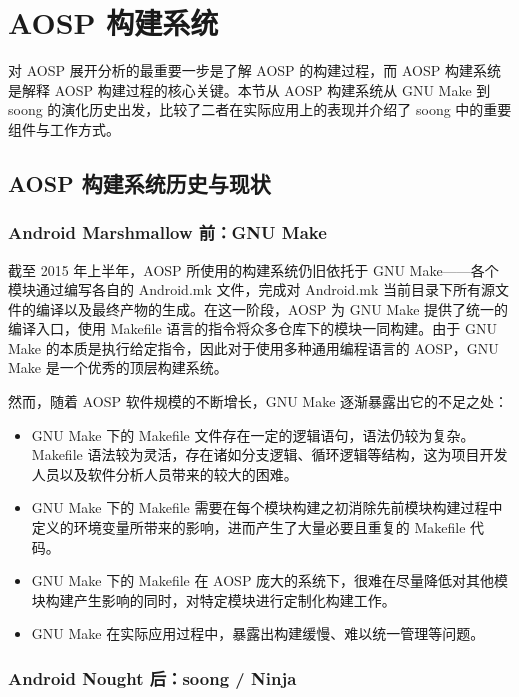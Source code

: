 \section{AOSP 构建系统}\label{aosp-build-system}

对 AOSP 展开分析的最重要一步是了解 AOSP 的构建过程，而 AOSP 构建系统是解释 AOSP 构建过程的核心关键。本节从 AOSP 构建系统从 GNU Make 到 soong 的演化历史出发，比较了二者在实际应用上的表现并介绍了 soong 中的重要组件与工作方式。

\subsection{AOSP 构建系统历史与现状}

\subsubsection{Android Marshmallow 前：GNU Make}

截至 2015 年上半年，AOSP 所使用的构建系统仍旧依托于 GNU Make——各个模块通过编写各自的 Android.mk 文件，完成对 Android.mk 当前目录下所有源文件的编译以及最终产物的生成。在这一阶段，AOSP 为 GNU Make 提供了统一的编译入口，使用 Makefile 语言的指令将众多仓库下的模块一同构建。由于 GNU Make 的本质是执行给定指令，因此对于使用多种通用编程语言的 AOSP，GNU Make 是一个优秀的顶层构建系统。

然而，随着 AOSP 软件规模的不断增长，GNU Make 逐渐暴露出它的不足之处：

\begin{itemize}
    \item GNU Make 下的 Makefile 文件存在一定的逻辑语句，语法仍较为复杂。Makefile 语法较为灵活，存在诸如分支逻辑、循环逻辑等结构，这为项目开发人员以及软件分析人员带来的较大的困难。
    \item GNU Make 下的 Makefile 需要在每个模块构建之初消除先前模块构建过程中定义的环境变量所带来的影响，进而产生了大量必要且重复的 Makefile 代码。
    \item GNU Make 下的 Makefile 在 AOSP 庞大的系统下，很难在尽量降低对其他模块构建产生影响的同时，对特定模块进行定制化构建工作。
    \item GNU Make 在实际应用过程中，暴露出构建缓慢、难以统一管理等问题。
\end{itemize}

\subsubsection{Android Nought 后：soong / Ninja}

